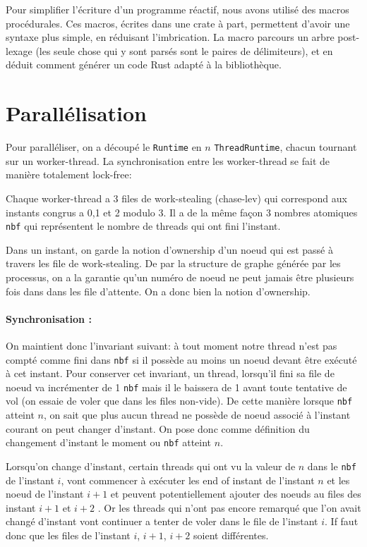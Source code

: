 \documentclass[a4paper]{article}
\renewcommand{\(}{\left(}
\renewcommand{\)}{\right)}
\begin{document}
Pour simplifier l'écriture d'un programme réactif, nous avons utilisé des macros
procédurales. Ces macros, écrites dans une crate à part, permettent d'avoir une
syntaxe plus simple, en réduisant l'imbrication. La macro parcours un arbre
post-lexage (les seule chose qui y sont parsés sont le paires de délimiteurs),
et en déduit comment générer un code Rust adapté à la bibliothèque.

\section{Parallélisation}

Pour paralléliser, on a découpé le \verb!Runtime! en $n$ \verb!ThreadRuntime!,
chacun tournant sur un worker-thread. La synchronisation entre les worker-thread
se fait de manière totalement lock-free:

Chaque worker-thread a 3 files de work-stealing (chase-lev) qui correspond aux
instants congrus a 0,1 et 2 modulo 3. Il a de la même façon 3 nombres atomiques \verb!nbf! qui
représentent le nombre de threads qui ont fini l'instant.

Dans un instant, on garde la notion d'ownership d'un noeud qui est passé à
travers les file de work-stealing. De par la structure de graphe générée par les
processus, on a la garantie qu'un numéro de noeud ne peut jamais être plusieurs
fois dans dans les file d'attente. On a donc bien la notion d'ownership.

\paragraph{Synchronisation :} On maintient donc l'invariant suivant: à tout
moment notre thread n'est pas compté comme
fini dans \verb!nbf! si il possède au moins un noeud devant être exécuté à cet
instant. Pour conserver cet invariant, un thread, lorsqu'il fini sa
file de noeud va incrémenter de 1 \verb!nbf! mais il le baissera de 1 avant
toute tentative de vol (on essaie de voler que dans les files non-vide). De cette
manière lorsque \verb!nbf! atteint $n$, on sait que plus aucun thread ne possède
de noeud associé à l'instant courant on peut changer d'instant. On pose donc
comme définition du changement d'instant le moment ou \verb!nbf! atteint $n$.

Lorsqu'on change d'instant, certain threads qui ont \og vu\fg{} la valeur de $n$
dans le \verb!nbf! de l'instant $i$, vont commencer à exécuter les end of
instant de l'instant $n$ et les noeud de l'instant $i+1$ et
peuvent potentiellement ajouter des noeuds au files des instant $i+1$ et $i+2$ .
Or les threads qui n'ont pas encore remarqué que l'on avait changé d'instant
vont continuer a tenter de voler dans le file de l'instant $i$. If faut donc que
les files de l'instant $i$, $i+1$, $i+2$ soient différentes.
\end{document}
